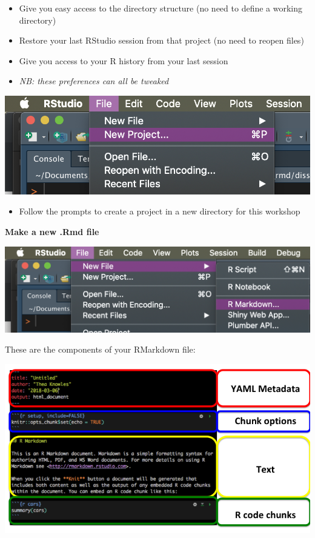 \documentclass[
  12pt,
  oneside]{book}
\providecommand{\tightlist}{%
  \setlength{\itemsep}{0pt}\setlength{\parskip}{0pt}}
\numberwithin{figure}{chapter}
\begin{document}
\begin{itemize}
\tightlist
\item
  Give you easy access to the directory structure (no need to define a working directory)
\item
  Restore your last RStudio session from that project (no need to reopen files)
\item
  Give you access to your R history from your last session
\item
  \emph{NB: these preferences can all be tweaked}
\end{itemize}

\includegraphics{../images/new_project.png}

\begin{itemize}
\tightlist
\item
  Follow the prompts to create a project in a new directory for this workshop
\end{itemize}

\textbf{Make a new .Rmd file}

\includegraphics{../images/new_rmd.png}

These are the components of your RMarkdown file:

\includegraphics{images/rmarkdown_parts.png}
\end{document}
